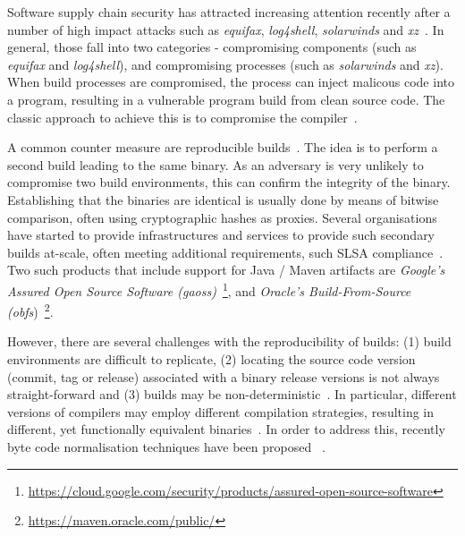 \documentclass[conference]{IEEEtran}
\begin{document}
Software supply chain security has attracted increasing attention recently after a number of high impact attacks such as \textit{equifax}, \textit{log4shell}, \textit{solarwinds} and \textit{xz}~\cite{ellison2010evaluating,martinez2021software,enck2022top,EO14028}. In general, those fall into two categories - compromising components (such as \textit{equifax} and \textit{log4shell}), and compromising processes (such as \textit{solarwinds} and \textit{xz}). When build processes are compromised, the process can inject malicous code into a program, resulting in a vulnerable program build from clean source code. The classic approach to achieve this is to compromise the compiler~\cite{thompson1984reflections}. 

A common counter measure are reproducible builds~\cite{reproduciblebuild, lamb2021reproducible}. The idea is to perform a second build leading to the same binary. As an adversary is very unlikely to compromise two build environments, this can confirm the integrity of the binary. Establishing that the binaries are identical is usually done by means of bitwise comparison, often using cryptographic hashes as proxies.
Several organisations have started to provide infrastructures and services to provide such secondary builds at-scale, often meeting additional requirements, such  SLSA compliance~\cite{slsa}. Two such products that include support for Java / Maven artifacts are \textit{Google's Assured Open Source Software (gaoss)}~\footnote{\url{https://cloud.google.com/security/products/assured-open-source-software}}, and \textit{Oracle's Build-From-Source (obfs})~\footnote{\url{https://maven.oracle.com/public/}}.

However, there are several challenges with the reproducibility of builds: (1) build environments are difficult to replicate, (2) locating the source code version (commit, tag or release) associated with a binary release versions is not always straight-forward and (3) builds may be non-deterministic~\cite{xiong2022towards,hassanshahi2023macaron,bineqdataset,keshani2024aroma}. In particular, different versions of compilers may employ different compilation strategies, resulting in different, yet functionally equivalent binaries~\cite{xiong2022towards,bineqdataset,schott2024JNorm}.  
In order to address this, recently byte code normalisation techniques have been proposed ~\cite{xiong2022towards,bineqdataset,schott2024JNorm}. 
\end{document}

